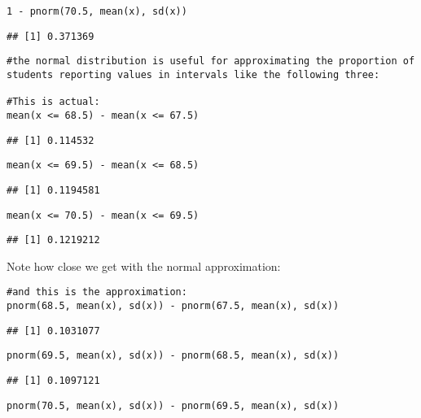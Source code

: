 \documentclass[
]{article}
\begin{document}
\begin{verbatim}
1 - pnorm(70.5, mean(x), sd(x))
\end{verbatim}

\begin{verbatim}
## [1] 0.371369
\end{verbatim}

\begin{verbatim}
#the normal distribution is useful for approximating the proportion of students reporting values in intervals like the following three:

#This is actual:
mean(x <= 68.5) - mean(x <= 67.5)
\end{verbatim}

\begin{verbatim}
## [1] 0.114532
\end{verbatim}

\begin{verbatim}
mean(x <= 69.5) - mean(x <= 68.5)
\end{verbatim}

\begin{verbatim}
## [1] 0.1194581
\end{verbatim}

\begin{verbatim}
mean(x <= 70.5) - mean(x <= 69.5)
\end{verbatim}

\begin{verbatim}
## [1] 0.1219212
\end{verbatim}

Note how close we get with the normal approximation:

\begin{verbatim}
#and this is the approximation:
pnorm(68.5, mean(x), sd(x)) - pnorm(67.5, mean(x), sd(x)) 
\end{verbatim}

\begin{verbatim}
## [1] 0.1031077
\end{verbatim}

\begin{verbatim}
pnorm(69.5, mean(x), sd(x)) - pnorm(68.5, mean(x), sd(x)) 
\end{verbatim}

\begin{verbatim}
## [1] 0.1097121
\end{verbatim}

\begin{verbatim}
pnorm(70.5, mean(x), sd(x)) - pnorm(69.5, mean(x), sd(x)) 
\end{verbatim}
\end{document}
